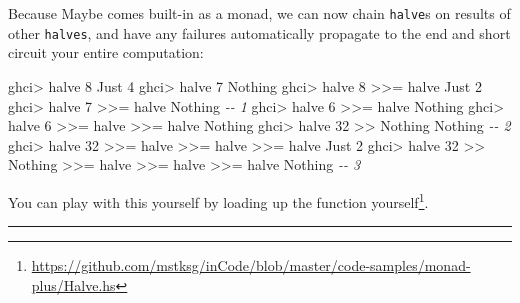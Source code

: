 \documentclass[]{article}
\newenvironment{Shaded}{}{}
\newcommand{\CommentTok}[1]{\textcolor[rgb]{0.38,0.63,0.69}{\textit{#1}}}
\newcommand{\DataTypeTok}[1]{\textcolor[rgb]{0.56,0.13,0.00}{#1}}
\newcommand{\DecValTok}[1]{\textcolor[rgb]{0.25,0.63,0.44}{#1}}
\newcommand{\NormalTok}[1]{#1}
\newcommand{\OperatorTok}[1]{\textcolor[rgb]{0.40,0.40,0.40}{#1}}
\renewcommand{\href}[2]{#2\footnote{\url{#1}}}
\begin{document}
Because Maybe comes built-in as a monad, we can now chain \texttt{halve}s on
results of other \texttt{halves}, and have any failures automatically propagate
to the end and short circuit your entire computation:

\begin{Shaded}
\begin{Highlighting}[]
\NormalTok{ghci}\OperatorTok{\textgreater{}}\NormalTok{ halve }\DecValTok{8}
\DataTypeTok{Just} \DecValTok{4}
\NormalTok{ghci}\OperatorTok{\textgreater{}}\NormalTok{ halve }\DecValTok{7}
\DataTypeTok{Nothing}
\NormalTok{ghci}\OperatorTok{\textgreater{}}\NormalTok{ halve }\DecValTok{8} \OperatorTok{\textgreater{}\textgreater{}=}\NormalTok{ halve}
\DataTypeTok{Just} \DecValTok{2}
\NormalTok{ghci}\OperatorTok{\textgreater{}}\NormalTok{ halve }\DecValTok{7} \OperatorTok{\textgreater{}\textgreater{}=}\NormalTok{ halve}
\DataTypeTok{Nothing}                         \CommentTok{{-}{-} 1}
\NormalTok{ghci}\OperatorTok{\textgreater{}}\NormalTok{ halve }\DecValTok{6} \OperatorTok{\textgreater{}\textgreater{}=}\NormalTok{ halve}
\DataTypeTok{Nothing}
\NormalTok{ghci}\OperatorTok{\textgreater{}}\NormalTok{ halve }\DecValTok{6} \OperatorTok{\textgreater{}\textgreater{}=}\NormalTok{ halve }\OperatorTok{\textgreater{}\textgreater{}=}\NormalTok{ halve}
\DataTypeTok{Nothing}
\NormalTok{ghci}\OperatorTok{\textgreater{}}\NormalTok{ halve }\DecValTok{32} \OperatorTok{\textgreater{}\textgreater{}} \DataTypeTok{Nothing}
\DataTypeTok{Nothing}                         \CommentTok{{-}{-} 2}
\NormalTok{ghci}\OperatorTok{\textgreater{}}\NormalTok{ halve }\DecValTok{32} \OperatorTok{\textgreater{}\textgreater{}=}\NormalTok{ halve }\OperatorTok{\textgreater{}\textgreater{}=}\NormalTok{ halve }\OperatorTok{\textgreater{}\textgreater{}=}\NormalTok{ halve}
\DataTypeTok{Just} \DecValTok{2}
\NormalTok{ghci}\OperatorTok{\textgreater{}}\NormalTok{ halve }\DecValTok{32} \OperatorTok{\textgreater{}\textgreater{}} \DataTypeTok{Nothing} \OperatorTok{\textgreater{}\textgreater{}=}\NormalTok{ halve }\OperatorTok{\textgreater{}\textgreater{}=}\NormalTok{ halve }\OperatorTok{\textgreater{}\textgreater{}=}\NormalTok{ halve}
\DataTypeTok{Nothing}                         \CommentTok{{-}{-} 3}
\end{Highlighting}
\end{Shaded}

You can play with this yourself by
\href{https://github.com/mstksg/inCode/blob/master/code-samples/monad-plus/Halve.hs}{loading
up the function yourself}.

\begin{center}\rule{0.5\linewidth}{0.5pt}\end{center}
\end{document}
